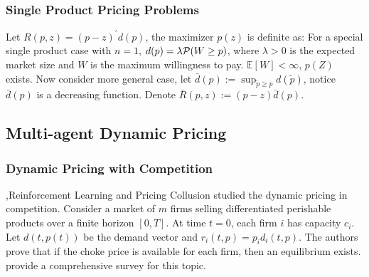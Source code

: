 \documentclass[10pt]{report}
\begin{document}
\subsubsection{Single Product Pricing Problems}
Let $R(p,z)=(p-z)^\prime d(p)$, the maximizer $p(z)$ is definite as:
For a special single product case with $n=1$, $d(p)=\lambda \mathcal{P}(W\ge p)$, where $\lambda>0$ is the expected market size and $W$ is the maximum willingness to pay.  $\mathbb{E}[W]<\infty$,  $p(Z)$ exists. Now consider more general case, let $\bar d(p):=\sup_{\tilde p\geq p}d(\tilde p)$, notice $\bar{d}(p)$ is a decreasing function. Denote $\bar{R}(p,z):=(p-z)\bar{d}(p)$.

\subsection{Multi-agent Dynamic Pricing}

\subsubsection{Dynamic Pricing with Competition}
\sep{Reinforcement Learning and Pricing Collusion}
\cite{gallego2014dynamic} studied the dynamic pricing in competition. Consider a market of $m$ firms selling differentiated perishable products over a finite horizon $[0,T]$. At time $t=0$, each firm $i$ has capacity $c_i$. Let $d(t,p(t))$ be the demand vector and $r_i(t,p)=p_id_i(t,p)$. The authors prove that if the choke price is available for each firm, then an equilibrium exists. \cite{Gerpott2022} provide a comprehensive survey for this topic.
\end{document}
